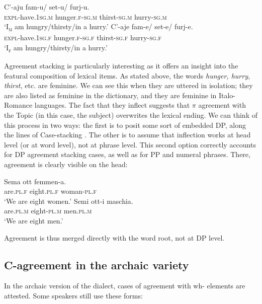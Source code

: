 \documentclass[output=paper
,modfonts
,nonflat]{langsci/langscibook}
\begin{document}
\begin{exe} 
	\ex  \xlist
	\ex 
	\gll C'-aju     fam-u/ set-u/ furj-u.\\
	\textsc{expl}{}-have.\textsc{1sg.m} hunger.\textsc{f-sg.m} thirst-\textsc{sg.m} hurry-\textsc{sg.m}\\
	\glt`I\textsc{\textsubscript{m}} am hungry/thirsty/in a hurry.'
	\ex
	\gll  C'-aje     fam-e/ set-e/ furj-e.\\
	\textsc{expl}{}-have.\textsc{1sg.f} hunger.\textsc{f-sg.f} thirst-\textsc{sg.f} hurry-\textsc{sg.f}\\ 
	\glt `I\textsc{\textsubscript{f}} am hungry/thirsty/in a hurry.'
	\endxlist
\end{exe}
Agreement stacking is particularly interesting as it offers an insight into the featural composition of lexical items. As stated above, the words \textit{hunger, hurry, thirst,} etc. are feminine. We can see this when they are uttered in isolation; they are also listed as feminine in the dictionary, and they are feminine in Italo-Romance languages. The fact that they inflect suggests that $\pi $ agreement with the Topic (in this case, the subject) overwrites the lexical ending. We can think of this process in two ways: the first is to posit some sort of embedded DP, along the lines of Case-stacking \citep{McCreight1988, Nordlinger1998, Merchant2006, Richards2013, Pesetsky2013}. The other is to assume that inflection works at head level (or at word level), not at phrase level. This second option correctly accounts for DP agreement stacking cases, as well as for PP and numeral phrases. There, agreement is clearly visible on the head: 

\begin{exe} 
	\ex \citet[30]{Lambertelli2003} \xlist
	\ex 
	\gll Sema   ott\footnotemark  {}  femmen-a.\\ 
	are.\textsc{pl.f} eight.\textsc{pl.f} woman-\textsc{pl.f}\\
	\glt`We are eight women.'
	\ex
	\gll Semi     ott-i     maschia.\\
	are.\textsc{pl.m} eight-\textsc{pl.m} men.\textsc{pl.m}\\ 
	\glt `We are eight men.'
	\endxlist
\end{exe}
Agreement is thus merged directly with the word root, not at DP level.

\subsection{C-agreement in the archaic variety}\label{sec-dalessandro:4.6}
In the archaic version of the dialect, cases of agreement with wh- elements are attested. Some speakers still use these forms:
\end{document}
